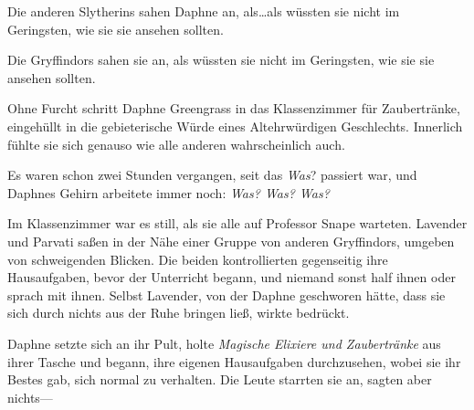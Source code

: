 
Die anderen Slytherins sahen Daphne an, als…als wüssten sie nicht im Geringsten, wie sie sie ansehen sollten.

Die Gryffindors sahen sie an, als wüssten sie nicht im Geringsten, wie sie sie ansehen sollten.

Ohne Furcht schritt Daphne Greengrass in das Klassenzimmer für Zaubertränke, eingehüllt in die gebieterische Würde eines Altehrwürdigen Geschlechts. Innerlich fühlte sie sich genauso wie alle anderen wahrscheinlich auch.

Es waren schon zwei Stunden vergangen, seit das \emph{Was}? passiert war, und Daphnes Gehirn arbeitete immer noch: \emph{Was? Was? Was?}

Im Klassenzimmer war es still, als sie alle auf Professor Snape warteten. Lavender und Parvati saßen in der Nähe einer Gruppe von anderen Gryffindors, umgeben von schweigenden Blicken. Die beiden kontrollierten gegenseitig ihre Hausaufgaben, bevor der Unterricht begann, und niemand sonst half ihnen oder sprach mit ihnen. Selbst Lavender, von der Daphne geschworen hätte, dass sie sich durch nichts aus der Ruhe bringen ließ, wirkte bedrückt.

Daphne setzte sich an ihr Pult, holte \emph{Magische Elixiere und Zaubertränke} aus ihrer Tasche und begann, ihre eigenen Hausaufgaben durchzusehen, wobei sie ihr Bestes gab, sich normal zu verhalten. Die Leute starrten sie an, sagten aber nichts—

